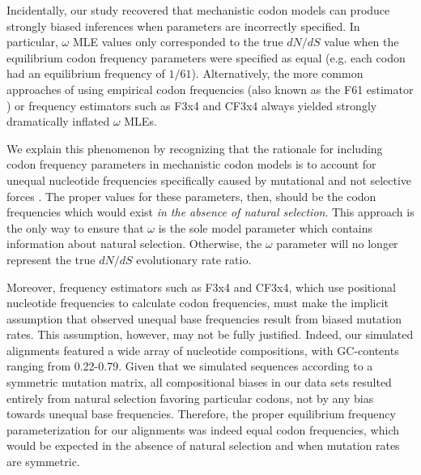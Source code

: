 \documentclass[11pt]{article}
\begin{document}
Incidentally, our study recovered that mechanistic codon models can produce strongly biased inferences when parameters are incorrectly specified. In particular, $\omega$ MLE values only corresponded to the true $dN/dS$ value when the equilibrium codon frequency parameters were specified as equal (e.g. each codon had an equilibrium frequency of $1/61$). Alternatively, 
 the more common approaches of using empirical codon frequencies (also known as the F61 estimator \cite{GoldmanYang1994}) or frequency estimators such as F3x4 \cite{MuseGaut1994} and CF3x4 \cite{Pond2010} always yielded strongly dramatically inflated $\omega$ MLEs. 

We explain this phenomenon by recognizing that the rationale for including codon frequency parameters in mechanistic codon  models is to account for unequal nucleotide frequencies specifically caused by mutational and not selective forces \cite{YN00, Yang2006}. The proper values for these parameters, then, should be the codon frequencies which would exist \textit{in the absence of natural selection}. This approach is the only way to ensure that $\omega$ is the sole model parameter which contains information about natural selection. Otherwise, the $\omega$ parameter will no longer represent the true $dN/dS$ evolutionary rate ratio.

Moreover, frequency estimators such as F3x4 and CF3x4, which use positional nucleotide frequencies to calculate codon frequencies, must make the implicit assumption that observed unequal base frequencies result from biased mutation rates.
This assumption, however, may not be fully justified. Indeed, our simulated alignments featured a wide array of nucleotide compositions, with GC-contents ranging from 0.22-0.79. Given that we simulated sequences according to a symmetric mutation matrix, all compositional biases in our data sets resulted entirely from natural selection favoring particular codons, not by any bias towards unequal base frequencies. Therefore, the proper equilibrium frequency parameterization for our alignments was indeed equal codon frequencies, which would be expected in the absence of natural selection and when mutation rates are symmetric. 
\end{document}
